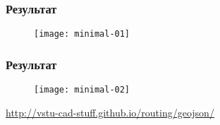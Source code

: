 



\begin{frame}
    \frametitle{Результат}
    \begin{figure}[ht!]
        \centering
        \texttt{[image: minimal-01]}
    \end{figure}
\end{frame}

\begin{frame}
    \frametitle{Результат}
    \begin{figure}[ht!]
        \centering
        \texttt{[image: minimal-02]}
    \end{figure}
    \url{http://vstu-cad-stuff.github.io/routing/geojson/}
\end{frame}

